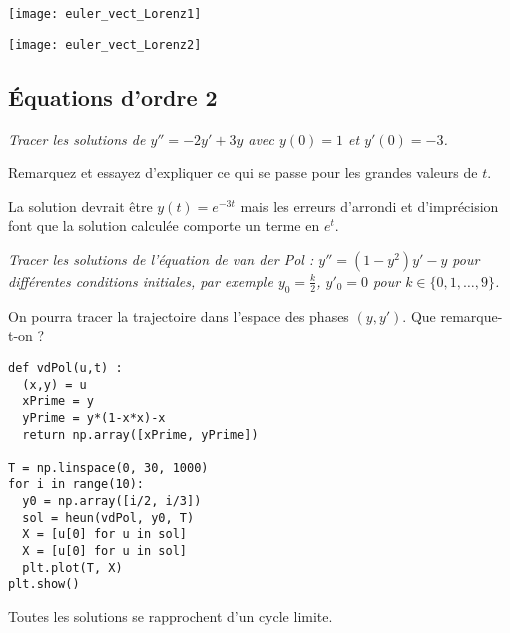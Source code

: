\begin{minipage}{0.45\linewidth}
\begin{center}
\texttt{[image: euler\_vect\_Lorenz1]}

\texttt{[image: euler\_vect\_Lorenz2]}    
\end{center}
\end{minipage}
\subsection{Équations d'ordre 2}
\begin{Exercise}
\it Tracer les solutions de 
$y'' = -2y'+3y$ avec $y(0)=1$ et $y'(0) = -3$. 

Remarquez et essayez d'expliquer ce qui se passe pour les grandes valeurs de $t$.
\end{Exercise}
\begin{Answer}
La solution devrait être $y(t) = e^{-3t}$ mais les erreurs d'arrondi et d'imprécision font que la solution calculée comporte un terme en $e^t$.
\end{Answer}
\begin{Exercise}\it 
Tracer les solutions de l'équation de van der Pol :
$y'' = (1-y^2)y'-y$ pour différentes conditions initiales, par exemple $y_0 = \frac k2$, $y'_0=0$ pour $k\in\{0,1,\ldots, 9\}$.

On pourra tracer la trajectoire dans l'espace des phases $(y, y')$. Que remarque-t-on ?
\end{Exercise}
\begin{Answer}
\begin{lstlisting}
def vdPol(u,t) :
  (x,y) = u
  xPrime = y
  yPrime = y*(1-x*x)-x
  return np.array([xPrime, yPrime])

T = np.linspace(0, 30, 1000)
for i in range(10):
  y0 = np.array([i/2, i/3])
  sol = heun(vdPol, y0, T)
  X = [u[0] for u in sol]
  X = [u[0] for u in sol]
  plt.plot(T, X)
plt.show()
\end{lstlisting}

Toutes les solutions se rapprochent d'un cycle limite.
\end{Answer}
